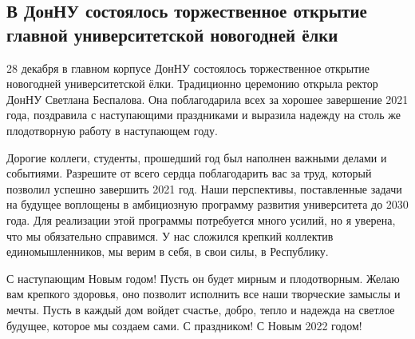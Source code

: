  
 
 
 
 
\subsection{В ДонНУ состоялось торжественное открытие главной университетской новогодней ёлки}
\label{sec:28_12_2021.stz.edu.dnr.donnu.1.jolka}


28 декабря в главном корпусе ДонНУ состоялось торжественное открытие новогодней
университетской ёлки. Традиционно церемонию открыла ректор ДонНУ Светлана
Беспалова. Она поблагодарила всех за хорошее завершение 2021 года, поздравила с
наступающими праздниками и выразила надежду на столь же плодотворную работу в
наступающем году.


\begin{zznagolos}

Дорогие коллеги, студенты, прошедший год был наполнен важными делами и
событиями. Разрешите от всего сердца поблагодарить вас за труд, который
позволил успешно завершить 2021 год. Наши перспективы, поставленные задачи на
будущее воплощены в амбициозную программу развития университета до 2030 года.
Для реализации этой программы потребуется много усилий, но я уверена, что мы
обязательно справимся. У нас сложился крепкий коллектив единомышленников, мы
верим в себя, в свои силы, в Республику.

С наступающим Новым годом! Пусть он будет мирным и плодотворным. Желаю вам
крепкого здоровья, оно позволит исполнить все наши творческие замыслы и мечты.
Пусть в каждый дом войдет счастье, добро, тепло и надежда на светлое будущее,
которое мы создаем сами. С праздником! С Новым 2022 годом!	
\end{zznagolos}

